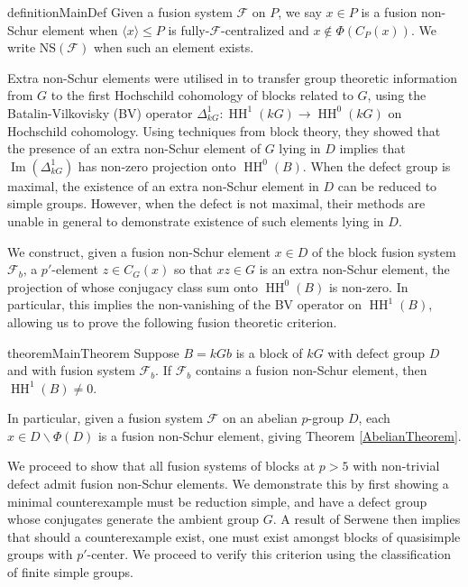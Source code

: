 \documentclass{amsart}
\theoremstyle{plain}\newtheorem{theorem}{Theorem}[section]
\theoremstyle{plain}\newtheorem{conjecture}[theorem]{Conjecture}
\theoremstyle{plain}\newtheorem{corollary}[theorem]{Corollary}
\theoremstyle{plain}\newtheorem{lemma}[theorem]{Lemma}
\theoremstyle{plain}\newtheorem{proposition}[theorem]{Proposition}
\theoremstyle{plain}\newtheorem{statement}[theorem]{}
\theoremstyle{definition}\newtheorem{definition}[theorem]{Definition}
\theoremstyle{definition}\newtheorem{example}[theorem]{Example}
\theoremstyle{definition}\newtheorem{examples}[theorem]{Examples}
\theoremstyle{definition}\newtheorem{notation}[theorem]{Notation}
\theoremstyle{definition}\newtheorem{remark}[theorem]{Remark}
\theoremstyle{definition}\newtheorem{remarks}[theorem]{Remarks}
\theoremstyle{definition}\newtheorem{question}[theorem]{Question}
\theoremstyle{definition}\newtheorem{propositiondefinition}[theorem]{Definition/Proposition}
\DeclareMathOperator{\HH}{HH}
\newcommand{\F}{\mathcal{F}}
\begin{document}
 \begin{restatable}{definition}{MainDef} Given a fusion system $\mathcal{F}$ on $P$, we say $x \in P$ is a fusion non-Schur element when $\langle x \rangle \leq P$ is fully-$\mathcal{F}$-centralized and $x \not \in \Phi(C_P(x))$. We write $\mathrm{NS}(\F)$ when such an element exists.
 \end{restatable} 
 
Extra non-Schur elements were utilised in \cite{BR} to transfer group theoretic information from $G$ to the first Hochschild cohomology of blocks related to $G$, using the Batalin-Vilkovisky (BV) operator $\Delta^1_{kG}:\HH^1(kG) \rightarrow \HH^0(kG)$ on Hochschild cohomology. Using techniques from block theory, they showed that the presence of an extra non-Schur element of $G$ lying in $D$ implies that $\operatorname{Im}(\Delta^1_{kG})$ has non-zero projection onto $\HH^0(B)$. When the defect group is maximal, the existence of an extra non-Schur element in $D$ can be reduced to simple groups. However, when the defect is not maximal, their methods are unable in general to demonstrate existence of such elements lying in $D$.

We construct, given a fusion non-Schur element $x \in D$ of the block fusion system $\F_b$, a $p'$-element $z \in C_G(x)$ so that $xz \in G$ is an extra non-Schur element, the projection of whose conjugacy class sum onto $\HH^0(B)$ is non-zero. In particular, this implies the non-vanishing of the BV operator on $\HH^1(B)$, allowing us to prove the following fusion theoretic criterion.

\begin{restatable}{theorem}{MainTheorem}\label{mainthm} Suppose $B=kGb$ is a block of $kG$ with defect group $D$ and with fusion system $\mathcal{F}_b$. If $\mathcal{F}_b$ contains a fusion non-Schur element, then $\operatorname{HH}^1(B)\not=0$.
\end{restatable}

In particular, given a fusion system $\mathcal{F}$ on an abelian $p$-group $D$, each $x \in D \backslash \Phi(D)$ is a fusion non-Schur element, giving Theorem \ref{AbelianTheorem}.

We proceed to show that all fusion systems of blocks at $p>5$ with non-trivial defect admit fusion non-Schur elements. We demonstrate this by first showing a minimal counterexample must be reduction simple, and have a defect group whose conjugates generate the ambient group $G$. A result of Serwene \cite[Lemma 3.4]{Serwene} then implies that should a counterexample exist, one must exist amongst blocks of quasisimple groups with $p'$-center. We proceed to verify this criterion using the classification of finite simple groups.
\end{document}
